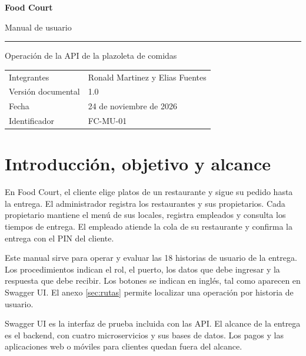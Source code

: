\documentclass[11pt,a4paper]{article}
\begin{document}
\begin{titlepage}
\thispagestyle{empty}
\vspace*{19mm}
{\sffamily\bfseries\fontsize{42}{45}\selectfont Food Court\par}
\vspace{3mm}
{\sffamily\fontsize{27}{30}\selectfont Manual de usuario\par}
\vspace{9mm}
\rule{42mm}{1.8pt}\par
\vspace{7mm}
{\Large Operación de la API de la plazoleta de comidas\par}
\vfill
\begin{tabularx}{\linewidth}{@{}P{38mm}Y@{}}
\toprule
Integrantes & Ronald Martinez y Elias Fuentes \\
Versión documental & 1.0 \\
Fecha & 24 de noviembre de 2026 \\
Identificador & FC-MU-01 \\
\bottomrule
\end{tabularx}
\vspace{15mm}
\end{titlepage}
\clearpage
\setcounter{page}{2}
\begingroup
\small
\setlength{\parskip}{0pt}
\makeatletter
\renewcommand*{\l@section}[2]{\addvspace{3pt}\begingroup\bfseries\@dottedtocline{1}{0em}{2em}{#1}{#2}\endgroup}
\makeatother
\tableofcontents
\endgroup
\clearpage
\begingroup
\small
\setlength{\parskip}{0pt}
\listoftables
\listoffigures
\endgroup
\clearpage
\section{Introducción, objetivo y alcance}\label{sec:alcance}
En Food Court, el cliente elige platos de un restaurante y sigue su pedido hasta la entrega. El administrador registra los restaurantes y sus propietarios. Cada propietario mantiene el menú de sus locales, registra empleados y consulta los tiempos de entrega. El empleado atiende la cola de su restaurante y confirma la entrega con el PIN del cliente.

Este manual sirve para operar y evaluar las 18 historias de usuario de la entrega. Los procedimientos indican el rol, el puerto, los datos que debe ingresar y la respuesta que debe recibir. Los botones se indican en inglés, tal como aparecen en Swagger UI. El anexo \ref{sec:rutas} permite localizar una operación por historia de usuario.

Swagger UI es la interfaz de prueba incluida con las API. El alcance de la entrega es el backend, con cuatro microservicios y sus bases de datos. Los pagos y las aplicaciones web o móviles para clientes quedan fuera del alcance.
\end{document}
